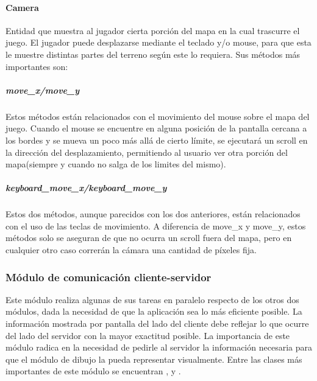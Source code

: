         \paragraph{Camera}
            Entidad que muestra al jugador cierta porción del mapa en la
            cual trascurre el juego. El jugador puede desplazarse mediante el
            teclado y/o mouse, para que esta le muestre distintas partes del
            terreno según este lo requiera. Sus métodos más importantes son:
            \subparagraph{move\_x/move\_y}
                Estos métodos están relacionados con el movimiento del mouse
                sobre el mapa del juego. Cuando el mouse se encuentre en alguna
                posición de la pantalla cercana a los bordes y se mueva un poco
                más allá de cierto límite, se ejecutará un scroll en la
                dirección del desplazamiento, permitiendo al usuario ver otra
                porción del mapa(siempre y cuando no salga de los limites del
                mismo).
            \subparagraph{keyboard\_move\_x/keyboard\_move\_y}
                Estos dos métodos, aunque parecidos con los dos anteriores,
                están relacionados con el uso de las teclas de movimiento. A
                diferencia de move\_x y move\_y, estos métodos solo se aseguran de
                que no ocurra un scroll fuera del mapa, pero en cualquier otro
                caso correrán la cámara una cantidad de píxeles fija.
    \subsubsection{Módulo de comunicación cliente-servidor}
        Este módulo realiza algunas de sus tareas en paralelo respecto de los
        otros dos módulos, dada la necesidad de que la aplicación sea lo más
        eficiente posible. La información mostrada por pantalla del lado del
        cliente debe reflejar lo que ocurre del lado del servidor con la mayor
        exactitud posible. La importancia de este módulo radica en la necesidad
        de pedirle al servidor la información necesaria para que el módulo de
        dibujo la pueda representar visualmente. Entre las clases más
        importantes de este módulo se encuentran ,
         y .
        \def\path{client/Comunicacion.jpg}
        \def\scale{.6}
        \def\text{Communication}
        
